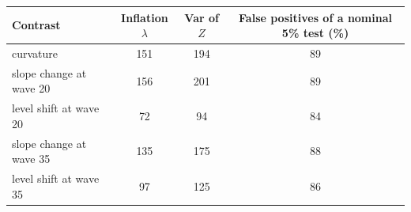 \begin{tabular}{lccc}
\toprule
Contrast & Inflation $\lambda$ & Var of $Z$ & False positives of a nominal 5\% test (\%) \\
\midrule
curvature & 151 & 194 & 89 \\
slope change at wave 20 & 156 & 201 & 89 \\
level shift at wave 20 & 72 & 94 & 84 \\
slope change at wave 35 & 135 & 175 & 88 \\
level shift at wave 35 & 97 & 125 & 86 \\
\bottomrule
\end{tabular}
